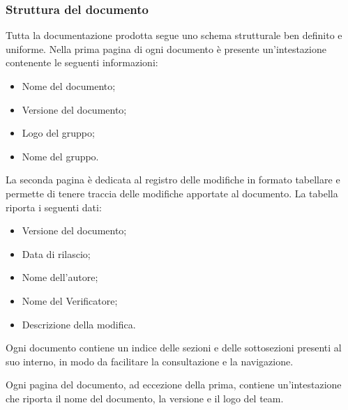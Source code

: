 \subsubsection{Struttura del documento}
Tutta la documentazione prodotta segue uno schema strutturale ben definito e uniforme.
Nella prima pagina di ogni documento è presente un'intestazione contenente le seguenti informazioni:
\begin{itemize}
	\item Nome del documento;
	\item Versione del documento;
	\item Logo del gruppo;
	\item Nome del gruppo.
\end{itemize}

La seconda pagina è dedicata al registro delle modifiche in formato tabellare e permette di tenere traccia delle modifiche apportate al documento.
La tabella riporta i seguenti dati:
\begin{itemize}
	\item Versione del documento;
	\item Data di rilascio;
	\item Nome dell'autore;
	\item Nome del Verificatore;
	\item Descrizione della modifica.
\end{itemize}

Ogni documento contiene un indice delle sezioni e delle sottosezioni presenti al suo interno, in modo da facilitare la consultazione e la navigazione.

Ogni pagina del documento, ad eccezione della prima, contiene un'intestazione che riporta il nome del documento, la versione e il logo del team.

